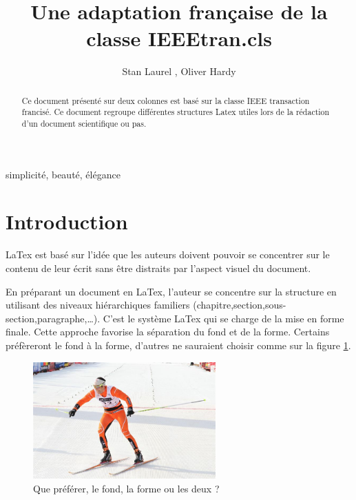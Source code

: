 \documentclass[twocolumn,a4paper]{IEEEtranfr}
\begin{document}
\title{Une adaptation française de la classe IEEEtran.cls}
\author{Stan Laurel , Oliver Hardy} 

\maketitle

\begin{abstract}
Ce document présenté sur deux colonnes est basé sur la classe IEEE transaction 
francisé. Ce document regroupe différentes structures Latex utiles lors de la rédaction d'un 
document scientifique ou pas. 
\end{abstract} 

\begin{keywords}
simplicité, beauté, élégance
\end{keywords}



\section{Introduction}

 LaTex est basé sur l'idée que les auteurs doivent pouvoir se concentrer sur
le contenu de leur écrit sans être distraits par l'aspect visuel du document. 

En préparant un document en LaTex, l'auteur se concentre sur la structure en
utilisant des niveaux hiérarchiques familiers
(chapitre,section,sous-section,paragraphe,\ldots). C'est le système LaTex qui
se charge de la mise en forme finale. Cette approche favorise la séparation du
fond et de la forme. Certains préfèreront le fond à la forme, d'autres ne
sauraient choisir comme sur la figure \ref{fig:fondforme}. 

\begin{figure}[htpb]
  \begin{center}
    \includegraphics[width=7cm] {fondforme.jpg}
  \end{center}
  \caption{Que préférer, le fond, la forme ou les deux ? }
  \label{fig:fondforme}
\end{figure}
\end{document}

